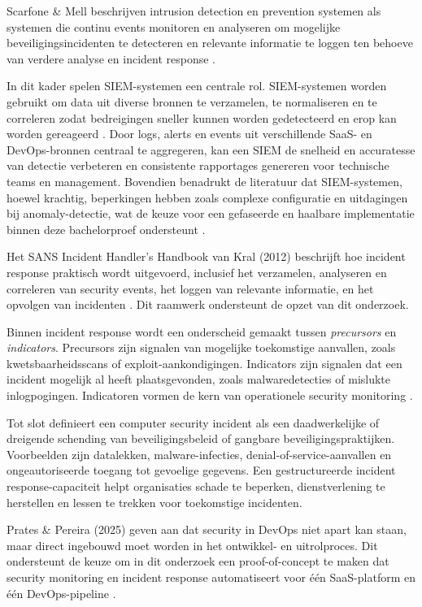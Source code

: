 Scarfone & Mell beschrijven intrusion detection en prevention systemen als systemen die continu events monitoren en analyseren om mogelijke beveiligingsincidenten te detecteren
en relevante informatie te loggen ten behoeve van verdere analyse en incident response \autocite{Scarfone_Mell_2007}.

In dit kader spelen SIEM-systemen een centrale rol. SIEM-systemen worden gebruikt om data uit diverse bronnen te verzamelen, te normaliseren en te correleren zodat bedreigingen 
sneller kunnen worden gedetecteerd en erop kan worden gereageerd \autocite{s21144759}. Door logs, alerts en events uit verschillende SaaS- en DevOps-bronnen centraal 
te aggregeren, kan een SIEM de snelheid en accuratesse van detectie verbeteren en consistente rapportages genereren voor technische teams en management. Bovendien benadrukt de literatuur 
dat SIEM-systemen, hoewel krachtig, beperkingen hebben zoals complexe configuratie en uitdagingen bij anomaly-detectie, wat de keuze voor een gefaseerde en haalbare implementatie binnen 
deze bachelorproef ondersteunt \autocite{s21144759}.
 
Het SANS Incident Handler’s Handbook van Kral (2012) beschrijft hoe incident response praktisch wordt uitgevoerd, inclusief het verzamelen, analyseren en correleren van security events, het loggen van relevante informatie, en het opvolgen van incidenten \autocite{kral2012}. 
Dit raamwerk ondersteunt de opzet van dit onderzoek.

Binnen incident response wordt een onderscheid gemaakt tussen \emph{precursors} en \emph{indicators}. Precursors zijn signalen van mogelijke toekomstige aanvallen, zoals kwetsbaarheidsscans 
of exploit-aankondigingen. Indicators zijn signalen dat een incident mogelijk al heeft plaatsgevonden, zoals malwaredetecties of mislukte inlogpogingen. Indicatoren vormen de kern 
van operationele security monitoring \autocite{nist80061r3}.

Tot slot definieert \autocite{nist80061r3} een computer security incident als een daadwerkelijke of dreigende schending van beveiligingsbeleid of gangbare beveiligingspraktijken. 
Voorbeelden zijn datalekken, malware-infecties, denial-of-service-aanvallen en ongeautoriseerde toegang tot gevoelige gegevens. Een gestructureerde incident response-capaciteit helpt organisaties 
schade te beperken, dienstverlening te herstellen en lessen te trekken voor toekomstige incidenten.

Prates \& Pereira (2025) geven aan dat security in DevOps niet apart kan staan, maar direct ingebouwd moet worden in het ontwikkel- en uitrolproces. Dit ondersteunt 
de keuze om in dit onderzoek een proof-of-concept te maken dat security monitoring en incident response automatiseert voor één SaaS-platform en één DevOps-pipeline \autocite{prates2025devsecops}.

